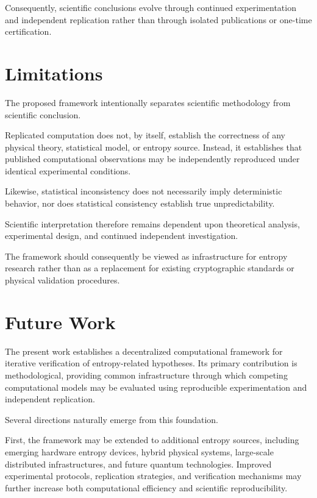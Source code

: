 \documentclass[11pt]{article}
\begin{document}
Consequently,
scientific conclusions evolve through continued experimentation and
independent replication rather than through isolated publications or
one-time certification.


\section{Limitations}

The proposed framework intentionally separates
scientific methodology
from scientific conclusion.

Replicated computation does not,
by itself,
establish the correctness of any physical theory,
statistical model,
or entropy source.
Instead,
it establishes that published computational observations
may be independently reproduced under identical experimental
conditions.

Likewise,
statistical inconsistency does not necessarily imply
deterministic behavior,
nor does statistical consistency establish true unpredictability.

Scientific interpretation therefore remains dependent upon
theoretical analysis,
experimental design,
and continued independent investigation.

The framework should consequently be viewed
as infrastructure for entropy research
rather than as a replacement for
existing cryptographic standards
or physical validation procedures.


\section{Future Work}


The present work establishes a decentralized computational framework
for iterative verification of entropy-related hypotheses.
Its primary contribution is methodological,
providing common infrastructure through which competing computational
models may be evaluated using reproducible experimentation and
independent replication.

Several directions naturally emerge from this foundation.

First,
the framework may be extended to additional entropy sources,
including emerging hardware entropy devices,
hybrid physical systems,
large-scale distributed infrastructures,
and future quantum technologies.
Improved experimental protocols,
replication strategies,
and verification mechanisms may further increase both computational
efficiency and scientific reproducibility.
\end{document}
